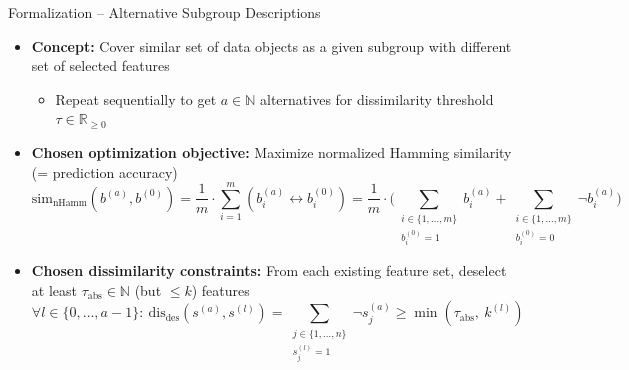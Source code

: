 \documentclass[en, navbaroff]{sdqbeamer}
\begin{document}
\begin{frame}[t]{Formalization -- Alternative Subgroup Descriptions}
	\begin{itemize}
		\item \textbf{Concept:} Cover similar set of data objects as a given subgroup with different set of selected features
		\begin{itemize}
			\item Repeat sequentially to get $a \in \mathbb{N}$ alternatives for dissimilarity threshold~$\tau \in \mathbb{R}_{\geq 0}$
		\end{itemize}
		\pause
		\vspace{\baselineskip}
		\item \textbf{Chosen optimization objective:} Maximize normalized Hamming similarity (= prediction accuracy)
		\begin{equation*}
			\text{sim}_{\text{nHamm}}(b^{(a)}, b^{(0)}) = \frac{1}{m} \cdot \sum_{i=1}^m \left( b_i^{(a)} \leftrightarrow b_i^{(0)} \right) = \frac{1}{m} \cdot \Big( \sum\limits_{\substack{i \in \{1, \dots, m\} \\ b_i^{(0)} = 1}} b_i^{(a)} + \sum\limits_{\substack{i \in \{1, \dots, m\} \\ b_i^{(0)} = 0}} \lnot b_i^{(a)} \Big)
		\end{equation*}
		\pause
		\vspace{\baselineskip}
		\item \textbf{Chosen dissimilarity constraints:} From each existing feature set, deselect at least $\tau_{\text{abs}} \in \mathbb{N}$ (but $\leq k$) features
		\begin{equation*}
			\forall l \in \{0, \dots, a-1\}:~ \text{dis}_{\text{des}}(s^{(a)}, s^{(l)}) = \sum_{\substack{j \in \{1, \dots, n\} \\ s^{(l)}_j = 1}} \lnot s^{(a)}_j \geq \min \left( \tau_{\text{abs}},~k^{(l)} \right)
		\end{equation*}
	\end{itemize}
\end{frame}
\end{document}
